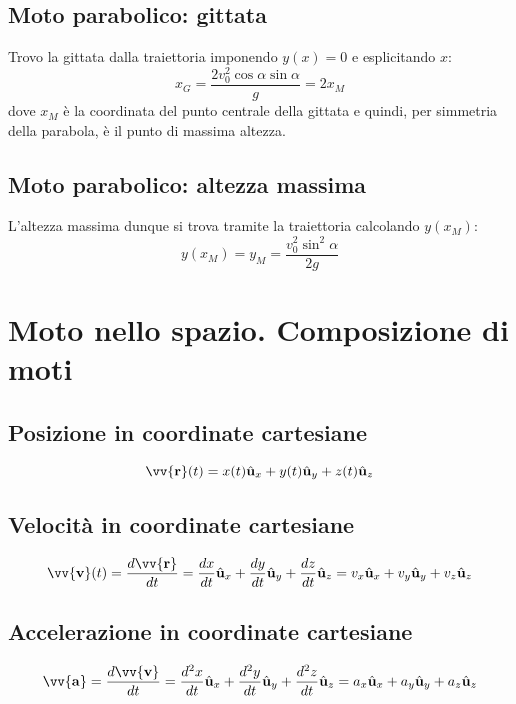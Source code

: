 \documentclass{report}
\newcommand{\versore}[1]{\hat{\mathbf{u}}_{#1}}
\newcommand{\ux}{\versore{x}}
\newcommand{\uy}{\versore{y}}
\newcommand{\uz}{\versore{z}}
\newcommand{\vett}[1]{\vv{\boldsymbol{\mathbf{#1}}}}
\begin{document}
\subsection{Moto parabolico: gittata}
Trovo la gittata dalla traiettoria imponendo \(y(x) = 0\) e esplicitando \(x\):
\begin{equation*}
    x_G = \frac{2v_0^2\cos\alpha\sin\alpha}{g} = 2x_M
\end{equation*}
dove \(x_M\) è la coordinata del punto centrale della gittata e quindi, 
per simmetria della parabola, è il punto di massima altezza. 

\subsection{Moto parabolico: altezza massima}
L'altezza massima dunque si trova tramite la traiettoria calcolando \(y(x_M)\):
\begin{equation*}
    y(x_M) = y_M = \frac{v_0^2\sin^2\alpha}{2g}
\end{equation*}

\section{Moto nello spazio. Composizione di moti}
\subsection{Posizione in coordinate cartesiane}
\begin{equation*}
    \vett{r}(t) = x(t)\ux + y(t)\uy + z(t)\uz
\end{equation*}

\subsection{Velocità in coordinate cartesiane}
\begin{equation*}
    \vett{v}(t) = \frac{d\vett{r}}{dt} 
    = \frac{dx}{dt}\ux + \frac{dy}{dt}\uy + \frac{dz}{dt}\uz
    = v_x\ux + v_y\uy + v_z\uz
\end{equation*}

\subsection{Accelerazione in coordinate cartesiane}
\begin{equation*}
    \vett{a} = \frac{d\vett{v}}{dt} 
    = \frac{d^2x}{dt}\ux + \frac{d^2y}{dt}\uy + \frac{d^2z}{dt}\uz
    = a_x\ux + a_y\uy + a_z\uz
\end{equation*}
\end{document}
